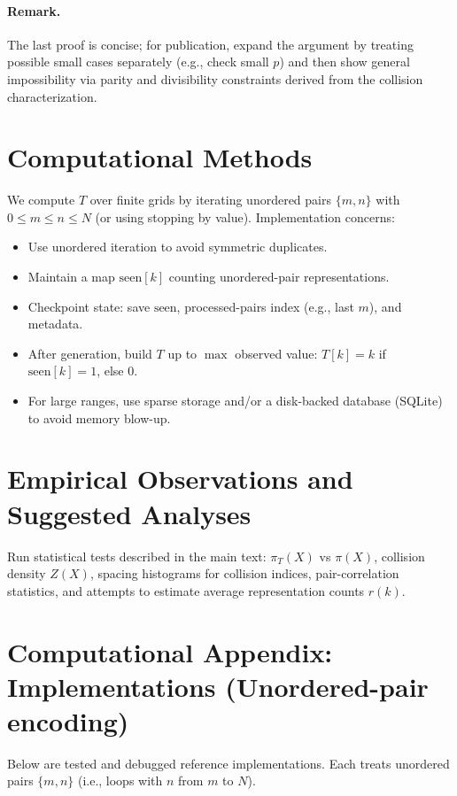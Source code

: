 \documentclass[12pt]{article}
\theoremstyle{definition}
\theoremstyle{plain}
\begin{document}
\paragraph{Remark.} The last proof is concise; for publication, expand the argument by treating possible small cases separately (e.g., check small \(p\)) and then show general impossibility via parity and divisibility constraints derived from the collision characterization.

\section{Computational Methods}
We compute \(T\) over finite grids by iterating unordered pairs \(\{m,n\}\) with \(0\le m\le n\le N\) (or using stopping by value). Implementation concerns:
\begin{itemize}
  \item Use unordered iteration to avoid symmetric duplicates.
  \item Maintain a map \(\text{seen}[k]\) counting unordered-pair representations.
  \item Checkpoint state: save \(\text{seen}\), processed-pairs index (e.g., last \(m\)), and metadata.
  \item After generation, build \(T\) up to \(\max\) observed value: \(T[k]=k\) if \(\text{seen}[k]=1\), else 0.
  \item For large ranges, use sparse storage and/or a disk-backed database (SQLite) to avoid memory blow-up.
\end{itemize}

\section{Empirical Observations and Suggested Analyses}
Run statistical tests described in the main text: \(\pi_T(X)\) vs \(\pi(X)\), collision density \(Z(X)\), spacing histograms for collision indices, pair-correlation statistics, and attempts to estimate average representation counts \(r(k)\).

\section{Computational Appendix: Implementations (Unordered-pair encoding)}

Below are tested and debugged reference implementations. Each treats unordered pairs \(\{m,n\}\) (i.e., loops with \(n\) from \(m\) to \(N\)).
\end{document}
